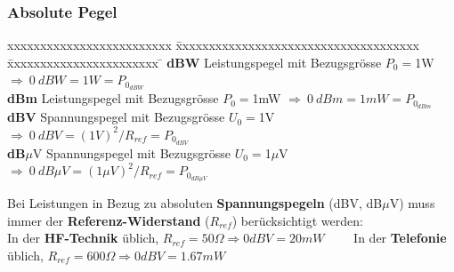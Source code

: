 \subsubsection{Absolute Pegel}
	\begin{tabbing}
	xxxxxxxxxxxxxxxxxxxxxxxxx \= xxxxxxxxxxxxxxxxxxxxxxxxxxxxxxxxxxxxx  \= xxxxxxxxxxxxxxxxxxxxxxx \=\kill
	\textbf{dBW} \> Leistungspegel mit Bezugsgrösse $P_0 = $1W \> $\Longrightarrow \: 0 \: dBW = 1W = P_{0_{dBW}}$\\
	\textbf{dBm} \> Leistungspegel mit Bezugsgrösse $P_0 = $1mW \> $\Longrightarrow \: 0 \: dBm = 1mW = P_{0_{dBm}}$\\
	\textbf{dBV} \> Spannungspegel mit Bezugsgrösse $U_0 = $1V \> $\Longrightarrow \: 0 \: dBV = (1V)^2/R_{ref} = P_{0_{dBV}}$\\
	\textbf{dB}$\mu$V \> Spannungspegel mit Bezugsgrösse $U_0 = $1$\mu$V \> $\Longrightarrow \: 0 \: dB \mu V = (1 \mu V)^2/R_{ref} = P_{0_{dB\mu V}}$
	\end{tabbing}
Bei Leistungen in Bezug zu absoluten \textbf{Spannungspegeln} (dBV, dB$\mu$V) muss immer der \textbf{Referenz-Widerstand} ($R_{ref}$) berücksichtigt werden: \\
In der \textbf{HF-Technik} üblich, $R_{ref} = 50 \Omega \Rightarrow 0 dBV = 20 mW \qquad $
In der \textbf{Telefonie} üblich, $R_{ref} = 600  \Omega \Rightarrow 0 dBV =
1.67 mW$ 

